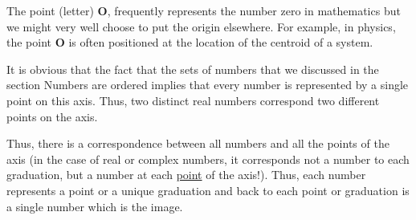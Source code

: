 	\begin{tcolorbox}[title=Remark,arc=10pt,breakable,drop lifted shadow,
  skin=enhanced,
  skin first is subskin of={enhancedfirst}{arc=10pt,no shadow},
  skin middle is subskin of={enhancedmiddle}{arc=10pt,no shadow},
  skin last is subskin of={enhancedlast}{drop lifted shadow}]
	The point (letter) \textbf{O}, frequently represents the number zero in mathematics but we might very well choose to put the origin elsewhere. For example, in physics, the point \textbf{O} is often positioned at the location of the centroid of a system. 
	\end{tcolorbox}
	It is obvious that the fact that the sets of numbers that we discussed in the section Numbers are ordered implies that every number is represented by a single point on this axis. Thus, two distinct real numbers correspond two different points on the axis.

	Thus, there is a correspondence between all numbers and all the points of the axis (in the case of real or complex numbers, it corresponds not a number to each graduation, but a number at each \underline{point} of the axis!). Thus, each number represents a point or a unique graduation and back to each point or graduation is a single number which is the image.

	\pagebreak
